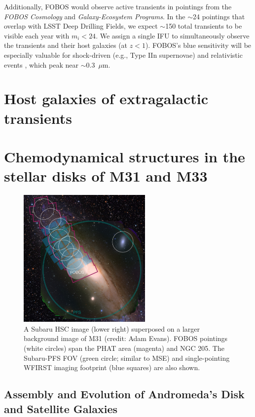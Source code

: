 \documentclass[11pt,a4paper,twoside,onecolumn,openany,final,oldfontcommands]{memoir}
\begin{document}
Additionally, FOBOS would observe active transients in pointings from the {\it FOBOS Cosmology} and {\it Galaxy-Ecosystem Programs}.  In the $\sim$24 pointings that overlap with LSST Deep Drilling Fields, we expect $\sim$150 total transients to be visible each year with $m_i<24$. We assign a single IFU to simultaneously observe the transients and their host galaxies (at $z<1$). FOBOS's blue sensitivity will be especially valuable for shock-driven (e.g., Type IIn supernovae) and relativistic events \citep[e.g., the atypically bright Type Ib supernova AT 2018cow;][]{margutti2019}, which peak near $\sim$0.3~$\mu$m. 


\section{Host galaxies of extragalactic transients}

\section{Chemodynamical structures in the stellar disks of M31 and M33}

\begin{figure}%
\includegraphics[width=0.58\textwidth]{figs/M31_footprint_v3.jpg}
\caption{A Subaru HSC image (lower right) superposed on a larger background image of M31 (credit: Adam Evans).  FOBOS pointings (white circles) span the PHAT area (magenta) and NGC 205.  The Subaru-PFS FOV (green circle; similar to MSE) and single-pointing WFIRST imaging footprint (blue squares) are also shown.}
\label{fig:M31}    
\end{figure}

\subsection{Assembly and Evolution of Andromeda's Disk and Satellite Galaxies}
\label{sec:localgroup}
\end{document}
